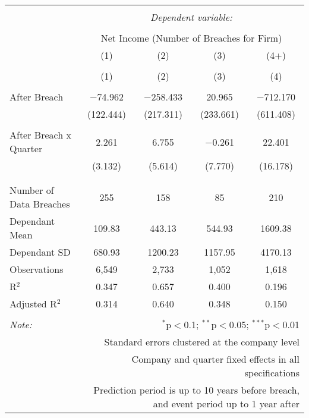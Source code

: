 
\begin{table}[!htbp] \centering 
  \caption{} 
  \label{} 
\begin{tabular}{@{\extracolsep{5pt}}lcccc} 
\\[-1.8ex]\hline 
\hline \\[-1.8ex] 
 & \multicolumn{4}{c}{\textit{Dependent variable:}} \\ 
\cline{2-5} 
\\[-1.8ex] & \multicolumn{4}{c}{Net Income (Number of Breaches for Firm)} \\ 
 & (1) & (2) & (3) & (4+) \\ 
\\[-1.8ex] & (1) & (2) & (3) & (4)\\ 
\hline \\[-1.8ex] 
 After Breach & $-$74.962 & $-$258.433 & 20.965 & $-$712.170 \\ 
  & (122.444) & (217.311) & (233.661) & (611.408) \\ 
  & & & & \\ 
 After Breach x Quarter & 2.261 & 6.755 & $-$0.261 & 22.401 \\ 
  & (3.132) & (5.614) & (7.770) & (16.178) \\ 
  & & & & \\ 
\hline \\[-1.8ex] 
Number of Data Breaches  & 255 & 158 & 85 & 210 \\ 
Dependant Mean & 109.83 & 443.13 & 544.93 & 1609.38 \\ 
Dependant SD & 680.93 & 1200.23 & 1157.95 & 4170.13 \\ 
Observations & 6,549 & 2,733 & 1,052 & 1,618 \\ 
R$^{2}$ & 0.347 & 0.657 & 0.400 & 0.196 \\ 
Adjusted R$^{2}$ & 0.314 & 0.640 & 0.348 & 0.150 \\ 
\hline 
\hline \\[-1.8ex] 
\textit{Note:}  & \multicolumn{4}{r}{$^{*}$p$<$0.1; $^{**}$p$<$0.05; $^{***}$p$<$0.01} \\ 
 & \multicolumn{4}{r}{Standard errors clustered at the company level} \\ 
 & \multicolumn{4}{r}{Company and quarter fixed effects in all specifications} \\ 
 & \multicolumn{4}{r}{Prediction period is up to 10 years before breach, and event period up to 1 year after} \\ 
\end{tabular} 
\end{table} 

